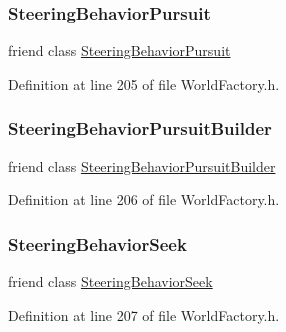\subsubsection{\texorpdfstring{Steering\+Behavior\+Pursuit}{SteeringBehaviorPursuit}}
{\footnotesize\ttfamily friend class \mbox{\hyperlink{classnjli_1_1_steering_behavior_pursuit}{Steering\+Behavior\+Pursuit}}\hspace{0.3cm}{\ttfamily [friend]}}



Definition at line 205 of file World\+Factory.\+h.

\mbox{\label{classnjli_1_1_world_factory_ae2adf47370adb0997eccd93936d58e38}} 
\subsubsection{\texorpdfstring{Steering\+Behavior\+Pursuit\+Builder}{SteeringBehaviorPursuitBuilder}}
{\footnotesize\ttfamily friend class \mbox{\hyperlink{classnjli_1_1_steering_behavior_pursuit_builder}{Steering\+Behavior\+Pursuit\+Builder}}\hspace{0.3cm}{\ttfamily [friend]}}



Definition at line 206 of file World\+Factory.\+h.

\mbox{\label{classnjli_1_1_world_factory_aa2cc41a75c2f9745d0b127905dae2fc3}} 
\subsubsection{\texorpdfstring{Steering\+Behavior\+Seek}{SteeringBehaviorSeek}}
{\footnotesize\ttfamily friend class \mbox{\hyperlink{classnjli_1_1_steering_behavior_seek}{Steering\+Behavior\+Seek}}\hspace{0.3cm}{\ttfamily [friend]}}



Definition at line 207 of file World\+Factory.\+h.

